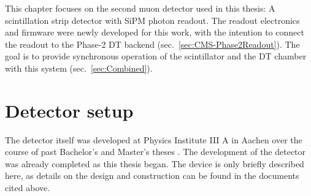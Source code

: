 
\label{sec:Scint}
This chapter focuses on the second muon detector used in this thesis: A scintillation strip detector with \ac{SiPM} photon readout. The readout electronics and firmware were newly developed for this work, with the intention to connect the readout to the Phase-2 \ac{DT} backend (sec.\ \ref{sec:CMS-Phase2Readout}). The goal is to provide synchronous operation of the scintillator and the \ac{DT} chamber with this system (sec.\ \ref{sec:Combined}).


\FloatBarrier
\section{Detector setup}
\label{sec:Scint-Setup}
The detector itself was developed at Physics Institute III A in Aachen over the course of past Bachelor's and Master's theses \cite{BSc-Ehlert,MSc-Ehlert}. The development of the detector was already completed as this thesis began. The device is only briefly described here, as details on the design and construction can be found in the documents cited above.
